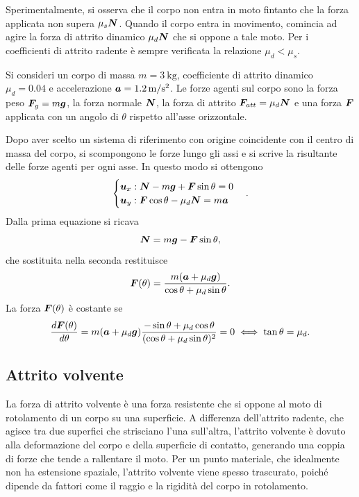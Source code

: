 Sperimentalmente, si osserva che il corpo non entra in moto fintanto che la forza applicata non supera $\mu_{s}\bm{N}$. Quando il corpo entra in movimento, comincia ad agire la forza di attrito dinamico $\mu_{d}\bm{N}$ che si oppone a tale moto. Per i coefficienti di attrito radente è sempre verificata la relazione $\mu_{d}<\mu_{s}$.
\begin{ex}
    Si consideri un corpo di massa $m=\SI{3}{\kg}$, coefficiente di attrito dinamico $\mu_{d}=0.04$ e accelerazione $\va=\SI{1.2}{\m/\s^2}$. Le forze agenti sul corpo sono la forza peso $\bm{F}_g=m\bm{g}$, la forza normale $\bm{N}$, la forza di attrito $\bm{F}_{att}=\mu_{d}\bm{N}$ e una forza $\bm{F}$ applicata con un angolo di $\theta$ rispetto all'asse orizzontale. 
    
    Dopo aver scelto un sistema di riferimento con origine coincidente con il centro di massa del corpo, si scompongono le forze lungo gli assi e si scrive la risultante delle forze agenti per ogni asse. In questo modo si ottengono
    \begin{equation}
        \begin{cases}
            \bm{u}_x:\bm{N}-m\bm{g}+\bm{F}\sin{\theta}=0 \\
            \bm{u}_y:\bm{F}\cos{\theta}-\mu_{d}\bm{N}=m\bm{a}
        \end{cases}.
    \end{equation}
    Dalla prima equazione si ricava
    \begin{equation}
        \bm{N}=m\bm{g}-\bm{F}\sin{\theta},
    \end{equation}
    che sostituita nella seconda restituisce 
    \begin{equation}
        \bm{F}(\theta)=\frac{m(\bm{a}+\mu_{d}\bm{g})}{\cos{\theta}+\mu_{d}\sin{\theta}}.
    \end{equation}
    La forza $\bm{F}(\theta)$ è costante se 
    \begin{equation}
        \frac{d\bm{F}(\theta)}{d\theta}=m(\bm{a}+\mu_{d}\bm{g})\frac{-\sin\theta+\mu_{d}\cos{\theta}}{(\cos{\theta}+\mu_{d}\sin{\theta})^2}=0\iff\tan{\theta}=\mu_{d}.
    \end{equation}
\end{ex}

\subsection{Attrito volvente}
La forza di attrito volvente è una forza resistente che si oppone al moto di rotolamento di un corpo su una superficie. A differenza dell'attrito radente, che agisce tra due superfici che strisciano l'una sull'altra, l'attrito volvente è dovuto alla deformazione del corpo e della superficie di contatto, generando una coppia di forze che tende a rallentare il moto. Per un punto materiale, che idealmente non ha estensione spaziale, l'attrito volvente viene spesso trascurato, poiché dipende da fattori come il raggio e la rigidità del corpo in rotolamento.

